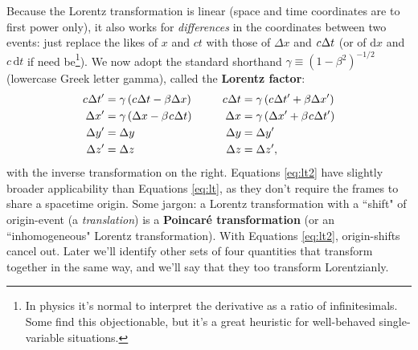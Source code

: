 \documentclass[12pt]{article}
\newcommand{\dd}[1]{\mathrm{d}#1}
\begin{document}
Because the Lorentz transformation is linear (space and time coordinates are to first power only), it also works for \emph{differences} in the coordinates between two events: just replace the likes of $x$ and $ct$ with those of $\Delta x$ and $c \mkern.5mu \Delta t$ (or of $\dd x$ and $c \, \dd t$ if need be\footnote{\label{fn:in}In physics it's normal to interpret the derivative as a ratio of infinitesimals. Some find this objectionable, but it's a great heuristic for well-behaved single-variable situations.}). We now adopt the standard shorthand $\gamma \equiv (1 - \beta^2)^{-1/2}$ (lowercase Greek letter gamma), called the \textbf{Lorentz factor}:
\begin{equation}\label{eq:lt2}
\begin{aligned}
c \mkern.5mu \Delta t^{\prime} &= \gamma \left( c \mkern.5mu \Delta t - \beta \Delta x \right) & c \mkern.5mu \Delta t &= \gamma \left( c \mkern.5mu \Delta t^\prime + \beta \Delta x^\prime \right) \\
\Delta x^{\prime} &= \gamma \left( \Delta x - \beta \mkern1mu c \mkern.5mu \Delta t \right) & \qquad \Delta x &= \gamma \left( \Delta x^\prime + \beta \mkern1mu c \mkern.5mu \Delta t^\prime \right) \\
\Delta y^{\prime} &= \Delta y& \Delta y&= \Delta y^\prime \\
\Delta z^{\prime} &= \Delta z& \Delta z&= \Delta z^\prime ,
\end{aligned}
\end{equation}
with the inverse transformation on the right. Equations \ref{eq:lt2} have slightly broader applicability than Equations \ref{eq:lt}, as they don't require the frames to share a spacetime origin. Some jargon: a Lorentz transformation with a ``shift" of origin-event (a \emph{translation}) is a \textbf{Poincar\'e transformation} (or an ``inhomogeneous" Lorentz transformation). With Equations \ref{eq:lt2}, origin-shifts cancel out. Later we'll identify other sets of four quantities that transform together in the same way, and we'll say that they too transform Lorentzianly.
\end{document}
